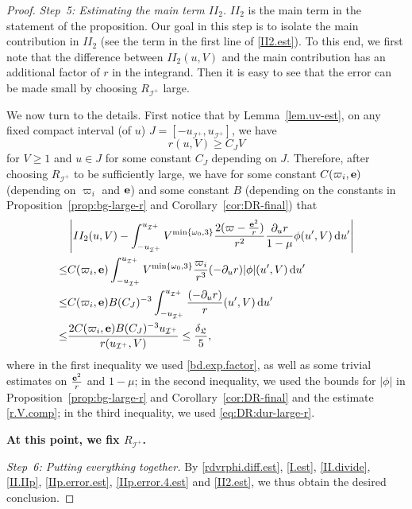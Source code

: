 \documentclass[10pt, reqno]{amsart}
\theoremstyle{definition}
\theoremstyle{remark}
\theoremstyle{conjecture}
\numberwithin{equation}{section}
\newcommand{\ud}{\mathrm{d}}
\newcommand{\rd}{\partial}
\newcommand{\0}{\emptyset}
\newcommand{\omg}{\omega}
\newcommand{\bfe}{{\bf e}}
\newcommand{\calI}{\mathcal I}
\newcommand{\f}{\frac}
\newcommand{\de}{\delta}
\newcommand{\pfstep}[1]{\vspace{.5em} {\it \noindent #1.}}
\newcommand{\e}{\bfe}							%
\begin{document}
\begin{proof}
\pfstep{Step~5: Estimating the main term $II_2$}
$II_2$ is the main term in the statement of the proposition. Our goal in this step is to isolate the main contribution in $II_2$ (see the term in the first line of \eqref{II2.est}). To this end, we first note that the difference between $II_2(u,V)$ and the main contribution has an additional factor of $r$ in the integrand. Then it is easy to see that the error can be made small by choosing $R_{\calI^+}$ large.
 
We now turn to the details. First notice that by Lemma~\ref{lem.uv-est}, on any fixed compact interval (of $u$) $J=[-u_{\calI^+}, u_{\calI^+}]$, we have 
\begin{equation}\label{r.V.comp}
r(u,V)\geq C_J V
\end{equation}
for $V\geq 1$ and $u\in J$ for some constant $C_J$ depending on $J$. Therefore, after choosing $R_{\calI^+}$ to be sufficiently large, we have for some constant $C(\varpi_i, \e)$ (depending on $\varpi_i$ and $\e$) and some constant $B$ (depending on the constants in Proposition~\ref{prop:bg-large-r} and Corollary~\ref{cor:DR-final}) that
\begin{equation}\label{II2.est}
\begin{split}
&\left| II_2(u,V)- \int_{-u_{\calI^+}}^{u_{\calI^+}}  V^{\min\{\omg_0,3\}}\frac{2(\varpi - \frac{\e^{2}}{r})}{r^{2}} \frac{\rd_{u} r}{1-\mu}\phi(u',V) \, \ud u'\right|\\
\leq &C(\varpi_i, \e) \int_{-u_{\calI^+}}^{u_{\calI^+}}  V^{\min\{\omg_0,3\}}\frac{\varpi_i }{r^{3}} (-\rd_{u} r)|\phi|(u',V) \, \ud u'\\
\leq & C(\varpi_i, \e) B (C_J)^{-3} \int_{-u_{\calI^+}}^{u_{\calI^+}}  \frac{(-\rd_{u} r)}{r} (u',V) \, \ud u'\\
\leq & \frac{2 C(\varpi_i, \e) B (C_J)^{-3} u_{\calI^+}}{r(u_{\calI^+},V)} 
\leq \f{\de_{\mathfrak L}}{5},
\end{split}
\end{equation}
where in the first inequality we used \eqref{bd.exp.factor}, as well as some trivial estimates on $\f{\e^2}{r}$ and $1-\mu$; in the second inequality, we used the bounds for $|\phi|$ in Proposition~\ref{prop:bg-large-r} and Corollary~\ref{cor:DR-final} and the estimate \eqref{r.V.comp}; in the third inequality, we used \eqref{eq:DR:dur-large-r}.

\textbf{At this point, we fix $R_{\calI^+}$.}


\pfstep{Step~6: Putting everything together} By \eqref{rdvrphi.diff.est}, \eqref{I.est}, \eqref{II.divide}, \eqref{II.IIp}, \eqref{IIp.error.est}, \eqref{IIp.error.4.est} and \eqref{II2.est}, we thus obtain the desired conclusion. \qedhere

\end{proof}
\end{document}
